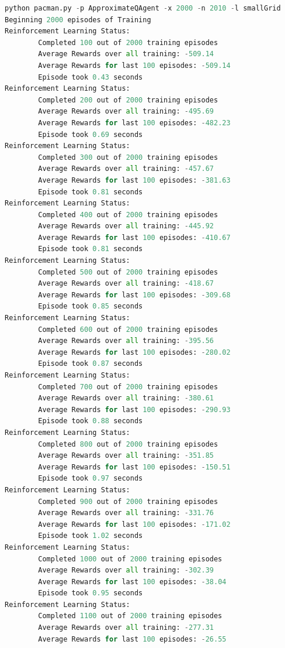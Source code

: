 \documentclass{report}
\begin{document}
\begin{lstlisting}[language=Python, caption=Q-Learning aproximado]
python pacman.py -p ApproximateQAgent -x 2000 -n 2010 -l smallGrid
Beginning 2000 episodes of Training
Reinforcement Learning Status:
        Completed 100 out of 2000 training episodes
        Average Rewards over all training: -509.14
        Average Rewards for last 100 episodes: -509.14
        Episode took 0.43 seconds
Reinforcement Learning Status:
        Completed 200 out of 2000 training episodes
        Average Rewards over all training: -495.69
        Average Rewards for last 100 episodes: -482.23
        Episode took 0.69 seconds
Reinforcement Learning Status:
        Completed 300 out of 2000 training episodes
        Average Rewards over all training: -457.67
        Average Rewards for last 100 episodes: -381.63
        Episode took 0.81 seconds
Reinforcement Learning Status:
        Completed 400 out of 2000 training episodes
        Average Rewards over all training: -445.92
        Average Rewards for last 100 episodes: -410.67
        Episode took 0.81 seconds
Reinforcement Learning Status:
        Completed 500 out of 2000 training episodes
        Average Rewards over all training: -418.67
        Average Rewards for last 100 episodes: -309.68
        Episode took 0.85 seconds
Reinforcement Learning Status:
        Completed 600 out of 2000 training episodes
        Average Rewards over all training: -395.56
        Average Rewards for last 100 episodes: -280.02
        Episode took 0.87 seconds
Reinforcement Learning Status:
        Completed 700 out of 2000 training episodes
        Average Rewards over all training: -380.61
        Average Rewards for last 100 episodes: -290.93
        Episode took 0.88 seconds
Reinforcement Learning Status:
        Completed 800 out of 2000 training episodes
        Average Rewards over all training: -351.85
        Average Rewards for last 100 episodes: -150.51
        Episode took 0.97 seconds
Reinforcement Learning Status:
        Completed 900 out of 2000 training episodes
        Average Rewards over all training: -331.76
        Average Rewards for last 100 episodes: -171.02
        Episode took 1.02 seconds
Reinforcement Learning Status:
        Completed 1000 out of 2000 training episodes
        Average Rewards over all training: -302.39
        Average Rewards for last 100 episodes: -38.04
        Episode took 0.95 seconds
Reinforcement Learning Status:
        Completed 1100 out of 2000 training episodes
        Average Rewards over all training: -277.31
        Average Rewards for last 100 episodes: -26.55

\end{lstlisting}
\end{document}

